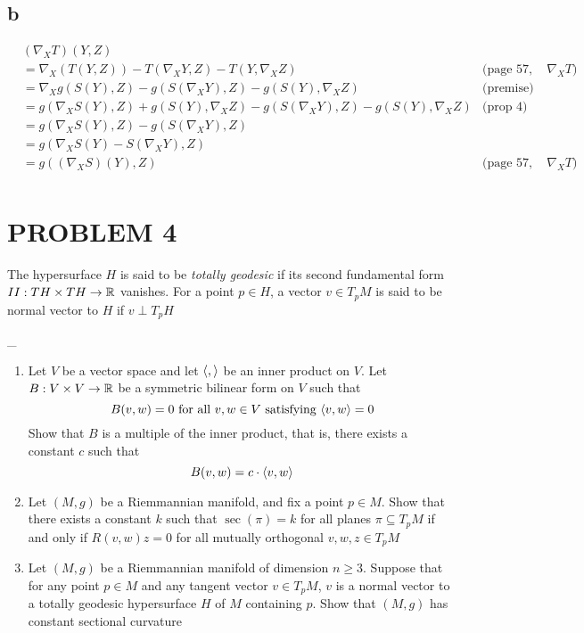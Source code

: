 \subsection{b}

\begin{align*}
	&(\nabla_X T)(Y, Z) \\
	&= \nabla_X (T(Y, Z)) - T(\nabla_X Y, Z) - T(Y, \nabla_X Z) &\text{(page 57, def of $\nabla_X T$)} \\
	&= \nabla_X g(S(Y), Z) - g(S(\nabla_X Y), Z) - g(S(Y), \nabla_X Z) &\text{(premise)}\\
	&= g(\nabla_X S(Y), Z) + g(S(Y), \nabla_X Z) - g(S(\nabla_X Y), Z) - g(S(Y), \nabla_X Z) &\text{(prop 4)}\\
	&= g(\nabla_X S(Y), Z) - g(S(\nabla_X Y), Z) \\
	&= g(\nabla_X S(Y) - S(\nabla_X Y), Z) \\
	&= g((\nabla_X S)(Y), Z) &\text{(page 57, def of $\nabla_X T$)} \\
\end{align*}


\section{PROBLEM 4}

\begin{definition}
	The hypersurface $H$ is said to be \textit{totally geodesic} if its second fundamental form $II: TH \times TH \to \mathbb{R}$ vanishes. For a point $p \in H$, a vector $v \in T_p M$ is said to be normal vector to $H$ if $v \perp T_p H$
\end{definition}

\begin{problem}
	\_
	\begin{enumerate}[label=(\alph*)]
		\item Let $V$ be a vector space and let $\langle,\rangle$ be an inner product on $V$. Let $B: V \times V \to \mathbb{R}$ be a symmetric bilinear form on $V$ such that
		$$
			B(v, w) = 0 \text{ for all $v, w \in V$ satisfying $\langle v, w\rangle = 0$}
		$$
		Show that $B$ is a multiple of the inner product, that is, there exists a constant $c$ such that 
		$$
			B(v, w) = c \cdot \langle v, w\rangle
		$$
		
		\item Let $(M, g)$ be a Riemmannian manifold, and fix a point $p \in M$. Show that there exists a constant $k$ such that $\sec(\pi) = k$ for all planes $\pi \subseteq T_p M$ if and only if $R(v, w)z = 0$ for all mutually orthogonal $v, w, z \in T_p M$
		
		\item Let $(M, g)$ be a Riemmannian manifold of dimension $n \geq 3$. Suppose that for any point $p \in M$ and any tangent vector $v \in T_p M$, $v$ is a normal vector to a totally geodesic hypersurface $H$ of $M$ containing $p$. Show that $(M, g)$ has constant sectional curvature
	\end{enumerate}
\end{problem}


